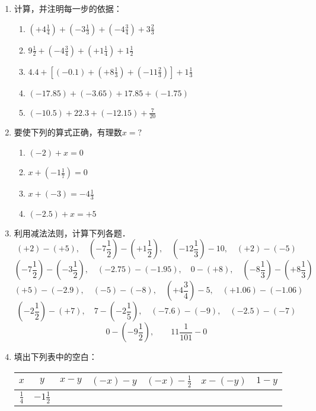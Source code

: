 \begin{enumerate}
	\item 计算，并注明每一步的依据：
	\begin{enumerate}
		\item $\left(+4 \frac{1}{4}\right)+\left(-3 \frac{1}{3}\right)+\left(-4 \frac{3}{4}\right)+3 \frac{2}{3}$
		\item $9 \frac{1}{2}+\left(-4 \frac{3}{4}\right)+\left(+1 \frac{1}{4}\right)+1 \frac{1}{2}$
		\item $4.4+\left[(-0.1)+\left(+8\frac{1}{3}\right)+\left(-11\frac{2}{3}\right)\right]+1\frac{1}{3}$
		\item $(-17.85)+(-3.65)+17.85+(-1.75)$
		\item $(-10.5)+22.3+(-12.15)+\frac{7}{20}$
	\end{enumerate}
	\item 要使下列的算式正确，有理数$x=?$
	\begin{multicols}{2}
		\begin{enumerate}
			\item $(-2)+x=0$
			\item $x+\left(-1\frac{1}{7}\right)=0$
			\item $x+(-3)=-4\frac{1}{3}$
			\item $(-2.5)+x=+5$
		\end{enumerate}
	\end{multicols}
	\item 利用减法法则，计算下列各题．
	\[(+2)-(+5),\quad \left(-7\frac{1}{2}\right)-\left(+1\frac{1}{2}\right),\quad \left(-12\frac{1}{3}\right)-10,\quad (+2)-(-5)\]
	\[\left(-7\frac{1}{2}\right)-\left(-3\frac{1}{2}\right),\quad (-2.75)-(-1.95),\quad 0-(+8),\quad \left(-8\frac{1}{3}\right)-\left(+8\frac{1}{3}\right)\]
	\[(+5)-(-2.9), \quad (-5)-(-8),\quad \left(+4\frac{3}{4}\right)-5,\quad (+1.06)-(-1.06)\]
	\[\left(-2\frac{1}{2}\right)-(+7),\quad 7-\left(-2\frac{1}{5}\right),\quad (-7.6)-(-9),\quad (-2.5)-(-7)\]
	\[0-\left(-9\frac{1}{2}\right),\qquad 11\frac{1}{101}-0\]
	
	\item 填出下列表中的空白：
	\begin{center}
		\begin{tabular}{c|c|c|c|c|c|c}
			\hline
			$x$  &  $y$  &  $x-y$  &  $(-x)-y$  &  $(-x)-\frac{1}{2}$  &  $x-(-y)$  &  $1-y$\\
			\hline
			$\frac{1}{4}$ & $-1\frac{1}{2}$ &&&&&\\
			\hline
		\end{tabular}    
	\end{center}
	

\end{enumerate}
